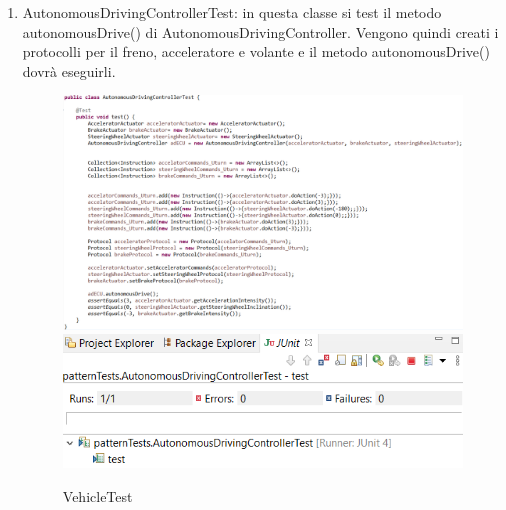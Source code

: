 \documentclass{article}
\begin{document}
\begin{enumerate}
\item AutonomousDrivingControllerTest: in questa classe si test il metodo autonomousDrive() di AutonomousDrivingController. Vengono quindi creati i protocolli per il freno, acceleratore e volante e il metodo autonomousDrive() dovrà eseguirli.
\begin{figure} [H]
\begin{center}
\includegraphics[scale=0.6]{AutonomousDrivingControllerTest.png}
\includegraphics[scale=0.6]{AutonomousDrivingControllerTestJUnit.png}
\end{center}
\caption{VehicleTest}
\end{figure}
\end{enumerate}
\end{document}
